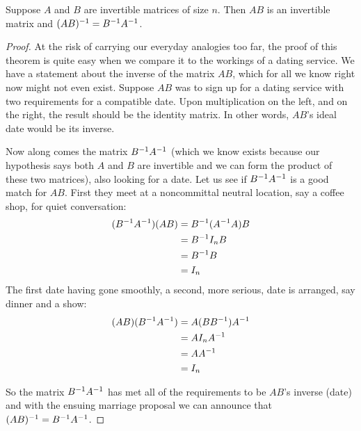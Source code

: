\documentclass{ximera}
\begin{document}
\begin{theorem}
\label{theorem:SS}

Suppose $A$ and $B$ are invertible matrices of size $n$.  Then $AB$ is
an invertible matrix and $(AB)^{-1}=B^{-1}A^{-1}$.

\begin{proof}
  At the risk of carrying our everyday analogies too far, the proof of
  this theorem is quite easy when we compare it to the workings of a
  dating service.  We have a statement about the inverse of the matrix
  $AB$, which for all we know right now might not even exist.  Suppose
  $AB$ was to sign up for a dating service with two requirements for a
  compatible date.  Upon multiplication on the left, and on the right,
  the result should be the identity matrix.  In other words, $AB$'s
  ideal date would be its inverse.

  Now along comes the matrix $B^{-1}A^{-1}$ (which we know
  exists because our hypothesis says both $A$ and $B$ are invertible
  and we can form the product of these two matrices), also looking for
  a date.  Let us see if $B^{-1}A^{-1}$ is a good match for
  $AB$.  First they meet at a noncommittal neutral location, say a
  coffee shop, for quiet conversation:
  \begin{align*}
    (\inverse{B}\inverse{A})(AB)
    &=\inverse{B}(\inverse{A}A)B\\ %
    &=\inverse{B}I_nB\\ %
    &=\inverse{B}B\\ %
    &=I_n\\ %
  \end{align*}
  The first date having gone smoothly, a second, more serious, date is arranged, say dinner and a show:
  \begin{align*}
    (AB)(\inverse{B}\inverse{A})
    &=A(B\inverse{B})\inverse{A}\\ %
    &=AI_n\inverse{A}\\ %
    &=A\inverse{A}\\ %
    &=I_n\\ %
  \end{align*}

  So the matrix $B^{-1}A^{-1}$ has met all of the
  requirements to be $AB$'s inverse (date) and with the ensuing
  marriage proposal we can announce that
  $(AB)^{-1}=B^{-1}A^{-1}$.
\end{proof}
\end{theorem}
\end{document}
